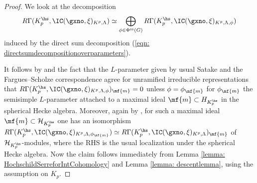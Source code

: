 \documentclass[letterpaper,11pt]{amsart}
\begin{document}
\begin{proof}
We look at the decomposition  
\[ R\Gamma(K_{p}^{\hs},\IC(\gxno,\xi)_{K^{p},\Lambda}) \simeq \bigoplus_{\phi \in \Phi^{\mathrm{ss}}(G)} R\Gamma(K_{p}^{\hs},\IC(\gxno,\xi)_{K^{p},\Lambda,\phi}) \]
induced by the direct sum decomposition (\ref{eqn: directsumdecompositionoverparameters}).

It follows by \cite[Lemma~4.2 (1)]{HamannLeeTorsion} and the fact that the $L$-parameter given by usual Satake and the Fargues--Scholze correspondence agree for unramified irreducible representations that $R\Gamma(K_{p}^{\hs},\IC(\gxno,\xi)_{K^{p},\Lambda,\phi})_{\mf{m}} = 0$ unless $\phi = \phi_{\mf{m}}$ for $\phi_{\mf{m}}$ the semisimple $L$-parameter attached to a maximal ideal $\mf{m} \subset H_{K_{p}^{\hs}}$ in the spherical Hecke algebra. Moreover, again by \cite[Lemma~4.2 (3)]{HamannLeeTorsion}, for such a maximal ideal $\mf{m} \subset \mathcal{H}_{K_{p}^{\hs}}$ one has an isomorphism $R\Gamma(K_{p}^{\hs},\IC(\gxno,\xi)_{K^{p},\Lambda,\phi_{\mf{m}}}) \simeq R\Gamma(K_{p}^{\hs},\IC(\gxno,\xi)_{K^{p},\Lambda})_{\mf{m}}$ of $\mathcal{H}_{K_{p}^{\hs}}$-modules, where the RHS is the usual localization under the spherical Hecke algebra. Now the claim follows immediately from Lemma \ref{lemma: HochschildSerreforIntCohomology} and Lemma \ref{lemma: descentlemma}, using the assumption on $K_{p}$. 
\end{proof}
\end{document}
